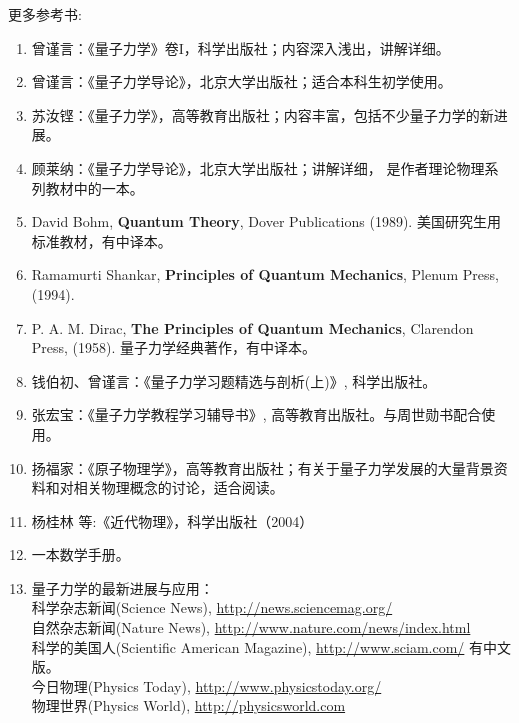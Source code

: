 更多参考书:


\begin{enumerate}


\item{曾谨言：《量子力学》卷I，科学出版社；内容深入浅出，讲解详细。}

\item{曾谨言：《量子力学导论》，北京大学出版社；适合本科生初学使用。}

\item{苏汝铿：《量子力学》，高等教育出版社；内容丰富，包括不少量子力学的新进展。}

\item{顾莱纳：《量子力学导论》，北京大学出版社；讲解详细，
是作者理论物理系列教材中的一本。}

\item{David Bohm, {\bf Quantum Theory}, Dover Publications (1989).
美国研究生用标准教材，有中译本。}

\item{Ramamurti Shankar, {\bf Principles of Quantum Mechanics}, Plenum Press, (1994).}

\item{P. A. M. Dirac, {\bf The Principles of Quantum Mechanics},
Clarendon Press, (1958). 量子力学经典著作，有中译本。}

\item{钱伯初、曾谨言：《量子力学习题精选与剖析(上)》,
科学出版社。}

\item{张宏宝：《量子力学教程学习辅导书》, 高等教育出版社。与周世勋书配合使用。}

\item{扬福家：《原子物理学》，高等教育出版社；有关于量子力学发展的大量背景资料和对相关物理概念的讨论，适合阅读。}

\item{杨桂林 等:《近代物理》，科学出版社（2004）}

\item{一本数学手册。}

\item{量子力学的最新进展与应用：
\\科学杂志新闻(Science News),
\url{http://news.sciencemag.org/}
\\自然杂志新闻(Nature News),
\url{http://www.nature.com/news/index.html}
\\科学的美国人(Scientific American Magazine),
\url{http://www.sciam.com/} 有中文版。
\\今日物理(Physics Today),
\url{http://www.physicstoday.org/}
\\物理世界(Physics World),
\url{http://physicsworld.com}

}
\end{enumerate}
